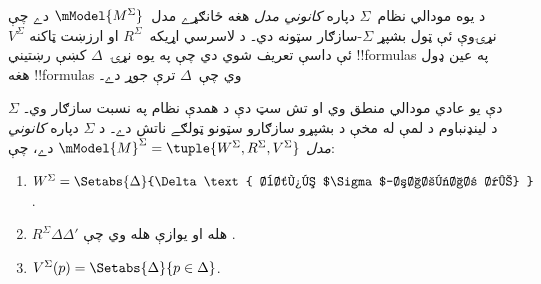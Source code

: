 \documentclass[../../../include/open-logic-section]{subfiles}
\begin{document}


د يوه مودالي نظام~$\Sigma$ دپاره \emph{کانوني مدل} هغه ځانګړے
مدل~$\mModel{M^\Sigma}$ دے چې نړۍوې ئې ټول بشپړ
$\Sigma$-سازګار سټونه دي۔ د لاسرسي اړيکه~$R^\Sigma$ او
ارزښت ټاکنه $V^\Sigma$ ئې داسې تعريف شوي دي چې په يوه
نړۍ~$\Delta$ کښې رښتيني !!{formula}s په عين ډول هغه
!!{formula}s وي چې~$\Delta$ ترې جوړ دے۔

\begin{defn}
  $\Sigma$ دې يو عادي مودالي منطق وي او تش سټ دې د همدې نظام
  په نسبت سازګار وي۔ د لينډنباوم د لمې له مخې د بشپړو سازګارو
  سټونو ټولګے ناتش دے۔ د $\Sigma$ دپاره
  \emph{کانوني مدل} $\mModel{M}^\Sigma = \tuple{W^\Sigma, R^\Sigma,
    V^\Sigma}$ دے، چې:
  \begin{enumerate}
  \item $W^\Sigma = \Setabs{ \Delta }{\Delta \text{
      بشپړ $\Sigma$-سازګار دے} }$.
  \item $R^\Sigma \Delta\Delta'$ هله او يوازې هله وي چې
    .
  \item $V^\Sigma(p) = \Setabs{\Delta}{p \in \Delta}$.
  \end{enumerate}
\end{defn}
\end{document}
